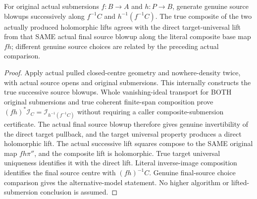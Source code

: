 \begin{theorem}
\label{hir:submersion-blowup-lift-composite}
\leanok
{}
For original actual submersions $f:B\to A$ and $h:P\to B$, generate genuine source blowups successively along $f^{-1}C$ and $h^{-1}(f^{-1}C)$. The true composite of the two actually produced holomorphic lifts agrees with the direct target-universal lift from that SAME actual final source blowup along the literal composite base map $fh$; different genuine source choices are related by the preceding actual comparison.
\end{theorem}
\begin{proof}
Apply actual pulled closed-centre geometry and nowhere-density twice, with actual source opens and original submersions. This internally constructs the true successive source blowups. Whole vanishing-ideal transport for BOTH original submersions and true coherent finite-span composition prove $(fh)^*\mathcal I_C=\mathcal I_{h^{-1}(f^{-1}C)}$ without requiring a caller composite-submersion certificate. The actual final source blowup therefore gives genuine invertibility of the direct target pullback, and the target universal property produces a direct holomorphic lift. The actual successive lift squares compose to the SAME original map $fh\pi''$, and the composite lift is holomorphic. True target universal uniqueness identifies it with the direct lift. Literal inverse-image composition identifies the final source centre with $(fh)^{-1}C$. Genuine final-source choice comparison gives the alternative-model statement. No higher algorithm or lifted-submersion conclusion is assumed.
\end{proof}

